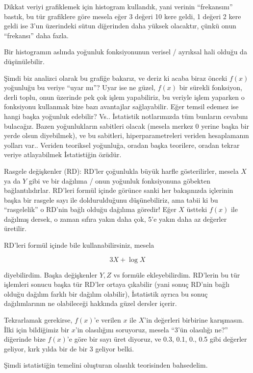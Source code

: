 \documentclass[12pt,fleqn]{article}\usepackage{../../common}
\begin{document}
Dikkat veriyi grafiklemek için histogram kullandık, yani verinin
``frekansını'' bastık, bu tür grafiklere göre mesela eğer 3 değeri 10 kere
geldi, 1 değeri 2 kere geldi ise 3'un üzerindeki sütun diğerinden daha
yüksek olacaktır, çünkü onun ``frekansı'' daha fazla.  

Bir histogramın aslında yoğunluk fonksiyonunun verisel / ayrıksal hali
olduğu da düşünülebilir.

Şimdi biz analizci olarak bu grafiğe bakarız, ve deriz ki acaba biraz
önceki $f(x)$ yoğunluğu bu veriye ``uyar mı''? Uyar ise ne güzel, $f(x)$
bir sürekli fonksiyon, derli toplu, onun üzerinde pek çok işlem
yapabiliriz, bu veriyle işlem yaparken o fonksiyonu kullanmak bize bazı
avantajlar sağlayabilir. Eğer temsil edemez ise hangi başka yoğunluk
edebilir?  Vs..  İstatistik notlarımızda tüm bunların cevabını
bulacağız. Bazen yoğunlukların sabitleri olacak (mesela merkez 0 yerine
başka bir yerde olsun diyebilmek), ve bu sabitleri, hiperparametreleri
veriden hesaplamanın yolları var.. Veriden teoriksel yoğunluğa, oradan
başka teorilere, oradan tekrar veriye atlayabilmek İstatistiğin özüdür.

Rasgele değişkenler (RD): RD'ler çoğunlukla büyük harfle gösterilirler,
mesela $X$ ya da $Y$ gibi ve bir dağılıma / onun yoğunluk fonksiyonuna
göbekten bağlantılıdırlar. RD'leri formül içinde görünce sanki her
bakışınızda içlerinin başka bir rasgele sayı ile doldurulduğunu
düşünebiliriz, ama tabii ki bu ``rasgelelik'' o RD'nin bağlı olduğu
dağılıma göredir! Eğer $X$ üstteki $f(x)$ ile dağılmış dersek, o zaman
sıfıra yakın daha çok, 5'e yakın daha az değerler üretilir.

RD'leri formül içinde bile kullanabilirsiniz, mesela 

$$ 3X + \log X $$ 

diyebilirdim. Başka değişkenler $Y,Z$ vs formüle ekleyebilirdim. RD'lerin
bu tür işlemleri sonucu başka tür RD'ler ortaya çıkabilir (yani sonuç
RD'nin bağlı olduğu dağılım farklı bir dağılım olabilir), İstatistik ayrıca
bu sonuç dağılımlarının ne olabileceği hakkında güzel dersler içerir.

Tekrarlamak gerekirse, $f(x)$'e verilen $x$ ile $X$'in değerleri birbirine
karışmasın. İlki için bildiğimiz bir $x$'in olasılığını soruyoruz, mesela
``3'ün olasılığı ne?'' diğerinde bize $f(x)$'e göre bir sayı üret diyoruz,
ve 0.3, 0.1, 0., 0.5 gibi değerler geliyor, kırk yılda bir de bir 3 geliyor
belki.

Şimdi istatistiğin temelini oluşturan olasılık teorisinden bahsedelim.
\end{document}
